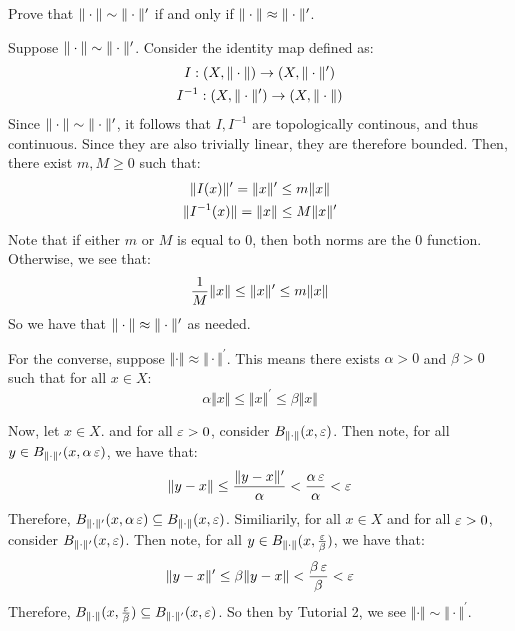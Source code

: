 \documentclass{article}
\begin{document}
\setcounter{subsection}{6}
\setcounter{exr}{38}

\begin{exr}
    Prove that $ \|\cdot\| \sim \|\cdot\|' $ if and only if
    $ \|\cdot\| \approx \|\cdot\|' $.
\end{exr}

\begin{pf}[source=bestie :D]
    Suppose $ \|\cdot\| \sim \|\cdot\|' $. Consider the identity map defined as:
    \begin{gather*}
        I : (X, \|\cdot\|) \rightarrow (X, \|\cdot\|') \\
        I^{-1} : (X, \|\cdot\|') \rightarrow (X, \|\cdot\|)
    \end{gather*}
    Since $ \|\cdot\| \sim \|\cdot\|' $, it follows that $ I, I^{-1} $ are topologically
    continous, and thus continuous. Since they are also trivially linear, they are therefore
    bounded. Then, there exist $ m, M \geq 0 $ such that:
    \begin{gather*}
        \|I(x)\|' = \|x\|' \leq m \|x\| \\
        \|I^{-1}(x)\| = \|x\| \leq M \|x\|'
    \end{gather*}
    Note that if either $ m $ or $ M $ is equal to $ 0 $, then both norms are the $ 0 $ function.
    Otherwise, we see that:
    \begin{equation*}
        \frac{1}{M}\|x\| \leq \|x\|' \leq m\|x\|
    \end{equation*}
    So we have that $ \|\cdot\| \approx \|\cdot\|' $ as needed.
\end{pf}

\begin{pf}[source=Alan]
    For the converse, suppose $\Vert \cdot \Vert \approx \Vert \cdot \Vert^\prime$.
    This means there exists $\alpha > 0$ and $\beta > 0$ such that for all $x \in X$:
    $$
    \alpha \Vert x \Vert \leq \Vert x \Vert^\prime \leq \beta \Vert x \Vert
    $$

    Now, let $x \in X$. and for all $\operatorname{\varepsilon} > 0$, consider $B_{\Vert \cdot \Vert}(x, \operatorname{\varepsilon})$. 
    Then note, for all $y \in B_{\Vert \cdot \Vert^\prime}(x, \alpha \operatorname{\varepsilon})$, we have that:
    $$
    \Vert y - x \Vert \leq \frac{ \Vert y - x \Vert^\prime }{\alpha}
    < \frac{\alpha \operatorname{\varepsilon}}{\alpha} < \operatorname{\varepsilon}
    $$
    Therefore, $B_{\Vert \cdot \Vert^\prime}(x, \alpha \operatorname{\varepsilon}) \subseteq 
    B_{\Vert \cdot \Vert}(x, \operatorname{\varepsilon})$. \vsp
    Similiarily, for all $x \in X$ and for all $\operatorname{\varepsilon} > 0$,
    consider $B_{\Vert \cdot \Vert^\prime}(x, \operatorname{\varepsilon})$. 
    Then note, for all $y \in B_{\Vert \cdot \Vert}(x, \frac{\operatorname{\varepsilon}}{\beta})$, we have that:
    $$
    \Vert y - x \Vert^\prime \leq  \beta \Vert y - x \Vert < \frac{\beta\operatorname{\varepsilon}}{\beta} < \operatorname{\varepsilon}
    $$
    Therefore, $B_{\Vert \cdot \Vert}(x, \frac{\operatorname{\varepsilon}}{\beta}) \subseteq B_{\Vert \cdot \Vert^\prime}(x, \operatorname{\varepsilon})$.
    So then by Tutorial 2, we see $\Vert \cdot \Vert \sim \Vert \cdot \Vert^\prime$.
\end{pf}
\end{document}
